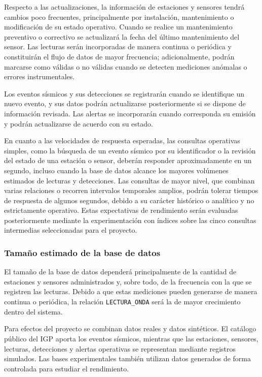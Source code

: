 \documentclass[12pt,a4paper]{article}
\begin{document}
Respecto a las actualizaciones, la información de estaciones y sensores tendrá cambios poco frecuentes, principalmente por instalación, mantenimiento o modificación de su estado operativo. Cuando se realice un mantenimiento preventivo o correctivo se actualizará la fecha del último mantenimiento del sensor. Las lecturas serán incorporadas de manera continua o periódica y constituirán el flujo de datos de mayor frecuencia; adicionalmente, podrán marcarse como válidas o no válidas cuando se detecten mediciones anómalas o errores instrumentales.

Los eventos sísmicos y sus detecciones se registrarán cuando se identifique un nuevo evento, y sus datos podrán actualizarse posteriormente si se dispone de información revisada. Las alertas se incorporarán cuando corresponda su emisión y podrán actualizarse de acuerdo con su estado.

En cuanto a las velocidades de respuesta esperadas, las consultas operativas simples, como la búsqueda de un evento sísmico por su identificador o la revisión del estado de una estación o sensor, deberán responder aproximadamente en un segundo, incluso cuando la base de datos alcance los mayores volúmenes estimados de lecturas y detecciones. Las consultas de mayor nivel, que combinan varias relaciones o recorren intervalos temporales amplios, podrán tolerar tiempos de respuesta de algunos segundos, debido a su carácter histórico o analítico y no estrictamente operativo. Estas expectativas de rendimiento serán evaluadas posteriormente mediante la experimentación con índices sobre las cinco consultas intermedias seleccionadas para el proyecto.


\subsubsection{Tamaño estimado de la base de datos}

El tamaño de la base de datos dependerá principalmente de la cantidad de estaciones y sensores administrados y, sobre todo, de la frecuencia con la que se registren las lecturas. Debido a que estas mediciones pueden generarse de manera continua o periódica, la relación \texttt{LECTURA\_\allowbreak{}ONDA} será la de mayor crecimiento dentro del sistema.

Para efectos del proyecto se combinan datos reales y datos sintéticos. El catálogo público del IGP aporta los eventos sísmicos, mientras que las estaciones, sensores, lecturas, detecciones y alertas operativas se representan mediante registros simulados. Las bases experimentales también utilizan datos generados de forma controlada para estudiar el rendimiento.
\end{document}
